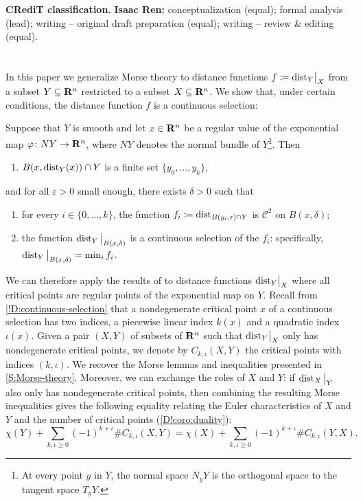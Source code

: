 \textbf{\sffamily CRediT classification.} \textbf{Isaac Ren:} conceptualization (equal); formal analysis (lead); writing -- original draft preparation (equal); writing -- review \& editing (equal).

\section[Morse theory of Euclidean distance functions]{}

In this paper we generalize Morse theory to distance functions $f \coloneq \mathord{\operatorname{dist}}_Y\big|_X$ from a subset $Y \subseteq \mathbf{R}^n$ restricted to a subset $X \subseteq \mathbf{R}^n$. We show that, under certain conditions, the distance function $f$ is a continuous selection:

\begin{proposition}
  Suppose that $Y$ is smooth and let $x \in \mathbf{R}^n$ be a regular value of the exponential map $\varphi \colon NY \to \mathbf{R}^n$, where $NY$ denotes the normal bundle of $Y$\footnote{At every point $y$ in $Y$, the normal space $N_y Y$ is the orthogonal space to the tangent space $T_y Y$.}. Then
  \begin{enumerate}
    \item
      $B(x, \operatorname{dist}_Y(x)) \cap Y$ is a finite set $\{y_0, \ldots, y_k\}$,
    \end{enumerate}
    and for all $\varepsilon > 0$ small enough, there exists $\delta >0$ such that
    \begin{enumerate}[resume]
    \item
      for every $i \in \{0, \ldots, k\}$, the function $f_i \coloneq \operatorname{dist}_{B(y_i, \varepsilon) \cap Y}$ is $\mathcal{C}^2$ on $B(x, \delta)$;
    \item
      the function $\operatorname{dist}_Y\big|_{B(x, \delta)}$ is a continuous selection of the $f_i$: specifically, $\operatorname{dist}_Y\big|_{B(x, \delta)} = \min_i f_i$.
    \end{enumerate}
\end{proposition}

We can therefore apply the results of \cite{APS1997} to distance functions $\mathord{\operatorname{dist}}_Y\big|_X$ where all critical points are regular points of the exponential map on $Y$. Recall from \cref{!D:continuous-selection} that a nondegenerate critical point $x$ of a continuous selection has two indices, a piecewise linear index $k(x)$ and a quadratic index $\iota(x)$. Given a pair $(X, Y)$ of subsets of $\mathbf{R}^n$ such that $\mathord{\operatorname{dist}}_Y\big|_X$ only has nondegenerate critical points, we denote by $C_{k, \iota}(X, Y)$ the critical points with indices $(k, \iota)$. We recover the Morse lemmas and inequalities presented in \cref{S:Morse-theory}. Moreover, we can exchange the roles of $X$ and $Y$: if $\operatorname{dist}_X\big|_Y$ also only has nondegenerate critical points, then combining the resulting Morse inequalities gives the following equality relating the Euler characteristics of $X$ and $Y$ and the number of critical points (\cref{D!coro:duality}):
\[
  \chi(Y) + \sum_{k, \iota \geq 0} (-1)^{k + \iota} \#C_{k, \iota}(X, Y) = \chi(X) + \sum_{k, \iota \geq 0} (-1)^{k + \iota} \#C_{k, \iota}(Y, X).
\]

